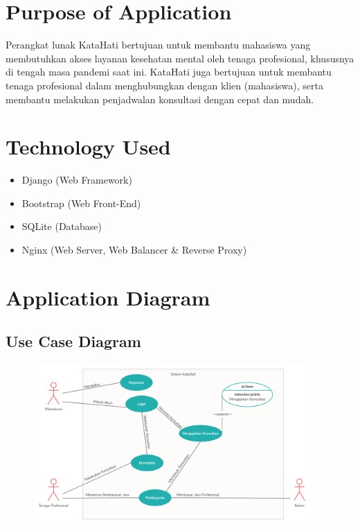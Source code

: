 \documentclass{article}
\begin{document}
	\section{Purpose of Application}
	\par Perangkat lunak KataHati bertujuan untuk membantu mahasiswa yang membutuhkan akses layanan kesehatan mental oleh tenaga profesional, khususnya di tengah masa pandemi saat ini. KataHati juga bertujuan untuk membantu tenaga profesional dalam menghubungkan dengan klien (mahasiswa), serta membantu melakukan penjadwalan konsultasi dengan cepat dan mudah.
	\section{Technology Used}
	\begin{itemize}
		\item Django (Web Framework)
		\item Bootstrap (Web Front-End)
		\item SQLite (Database)
		\item Nginx (Web Server, Web Balancer \& Reverse Proxy)
	\end{itemize}
	
	\section{Application Diagram}

	\subsection{Use Case Diagram}
	\begin{figure}[H]
		\centering
		\includegraphics[width=400px]{Use Case Kata Hati.png}
	\end{figure}
\end{document}
